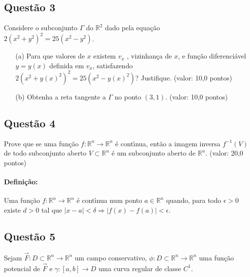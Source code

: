 \subsection{\color{blue} Quest\~ao 3}

Considere o subconjunto $\Gamma$ do $\mathbb R^2$ dado pela equa\c c\~ao $2(x^2+ y^2)^2=25(x^2-y^2)$.

\begin{enumerate}

\item[(a)] Para que valores de $x$ existem $v_x$ , vizinhan\c ca de $x$, e fun\c c\~ao diferenci\'avel $y = y(x)$ definida em $v_x$, satisfazendo $2(x^2+ y(x)^2)^2=25 (x^2-y(x)^2)$? Justifique. (valor: 10,0 pontos) 

\item[(b)] Obtenha a reta tangente a $\Gamma$ no ponto $(3, 1)$.
(valor: 10,0 pontos)

\end{enumerate}

\subsection{\color{blue} Quest\~ao 4}

Prove que se uma fun\c c\~ao $f: \mathbb R^n \to \mathbb R^n$ \'e cont\'\i nua, ent\~ao a imagem inversa $f^{-1}(V)$ de todo subconjunto aberto $V \subset \mathbb R^n$  \'e um subconjunto aberto de $\mathbb R^n$. (valor: 20,0 pontos)

\paragraph{Defini\c c\~ao:} Uma fun\c c\~ao $f: \mathbb R^n \to \mathbb R^n$ \'e cont\'\i nua num ponto $a \in \mathbb R^n$ quando, para todo $\epsilon > 0$ existe $d > 0$ tal que $|x - a| < \delta \Longrightarrow |f(x) - f(a)| < \epsilon$.

\subsection{\color{blue} Quest\~ao 5}

Sejam $\vec F: D \subset \mathbb R^n \to \mathbb R^n$ um campo conservativo, $\phi: D \subset \mathbb R^n \to \mathbb R^n$ uma fun\c c\~ao potencial de $\vec F$ e $\gamma:[a,b] \to D$ uma curva regular de classe $C^1$.

